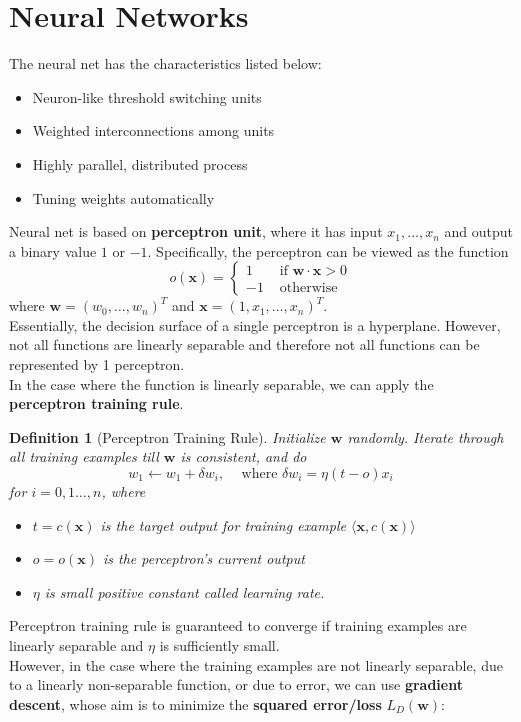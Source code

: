 \documentclass[12pt]{article}
\newtheorem{definition}{Definition}[section]
\theoremstyle{definition}
\begin{document}
\section{Neural Networks}
The neural net has the characteristics listed below:
\begin{itemize}
	\item Neuron-like threshold switching units
	\item Weighted interconnections among units
	\item Highly parallel, distributed process
	\item Tuning weights automatically
\end{itemize}
Neural net is based on \textbf{perceptron unit}, where it has input $x_1,\ldots, x_n$ and output a binary value $1$ or $-1$. Specifically, the perceptron can be viewed as the function
\[
o(\mathbf{x})=\begin{cases}
1&\text{ if }\mathbf{w}\cdot\mathbf{x}>0\\
-1&\text{ otherwise}
\end{cases}
\]
where $\mathbf{w}=(w_0,\ldots, w_n)^T$ and $\mathbf{x}=(1, x_1,\ldots, x_n)^T$.\\
Essentially, the decision surface of a single perceptron is a hyperplane. However, not all functions are linearly separable and therefore not all functions can be represented by 1 perceptron.\\
In the case where the function is linearly separable, we can apply the \textbf{perceptron training rule}.
\begin{definition}[Perceptron Training Rule]
\normalfont Initialize $\mathbf{w}$ randomly. Iterate through all training examples till $\mathbf{w}$ is consistent, and do
\[
w_1\leftarrow w_1+\delta w_i,\;\;\;\text{ where }\delta w_i = \eta(t-o)x_i
\]
for $i=0,1\ldots, n$, where
\begin{itemize}
	\item $t=c(\mathbf{x})$ is the target output for training example $\langle \mathbf{x}, c(\mathbf{x})\rangle$
	\item $o=o(\mathbf{x})$ is the perceptron's current output
	\item $\eta$ is small positive constant called learning rate.
\end{itemize}
\end{definition}
Perceptron training rule is guaranteed to converge if training examples are linearly separable and $\eta$ is sufficiently small.\\
However, in the case where the training examples are not linearly separable, due to a linearly non-separable function, or due to error, we can use \textbf{gradient descent}, whose aim is to minimize the \textbf{squared error/loss} $L_D(\mathbf{w})$:
\end{document}
